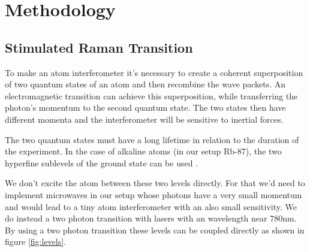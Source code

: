 \documentclass[english, a4paper, 11pt]{article}
\begin{document}

\section{Methodology}


\subsection{Stimulated Raman Transition}
To make an atom interferometer it's necessary to create a coherent superposition of two quantum states of an atom and then recombine the wave packets. An electromagnetic transition can achieve this superposition, while transferring the photon's momentum to the second quantum state. The two states then have different momenta and the interferometer will be sensitive to inertial forces.

The two quantum states must have a long lifetime in relation to the duration of the experiment. In the case of alkaline atoms (in our setup Rb-87), the two hyperfine sublevels of the ground state can be used
\cite{cheinet2006conception}.

We don't excite the atom between these two levels directly. For that we'd need to implement microwaves in our setup whose photons have a very small momentum and would lead to a tiny atom interferometer with an also small sensitivity. 
We do instead a two photon transition with lasers with an wavelength near 780nm. By using a two photon transition these levels can be coupled directly as shown in figure \ref{fig:levels}.
\end{document}
